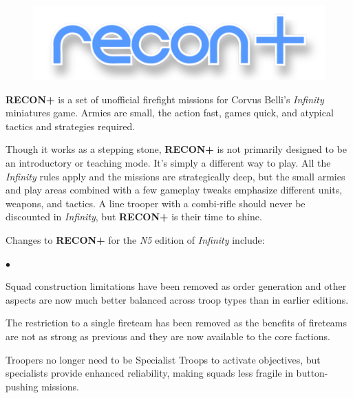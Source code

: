 \documentclass[14pt,dvipsnames]{extarticle}
\newenvironment{squishitemize}
{\begin{list}{$\bullet$}{%
    \setlength{\itemsep}{2pt}%
    \setlength{\parsep}{2pt}%
    \setlength{\topsep}{2pt}%
    \setlength{\parskip}{0pt} %
    \renewcommand{\labelitemi}{--}}}
  {\end{list}}
\newcommand{\reconplus}{\textbf{RECON+}\xspace}
\newcommand\BackgroundPic[1]{%
\put(0,0){%
\parbox[b][\paperheight]{\paperwidth}{%
\vfill%
\centering%
\texttt{[image: \#1]}%
\vfill%
}}}
\newcommand{\setbackground}{%
\AddToShipoutPicture{\BackgroundPic{art/background/background.pdf}}%
}
\begin{document}
\thispagestyle{empty}


\clearpage


\begin{figure}[t!]
  \centering
  \includegraphics{art/cover/title.pdf}
\end{figure}

\reconplus is a set of unofficial firefight missions for Corvus
Belli's \emph{Infinity} miniatures game.  Armies are small, the action
fast, games quick, and atypical tactics and strategies required.

Though it works as a stepping stone, \reconplus is not primarily
designed to be an introductory or teaching mode.  It's simply a
different way to play.  All the \emph{Infinity} rules apply and the
missions are strategically deep, but the small armies and play areas
combined with a few gameplay tweaks emphasize different units,
weapons, and tactics.  A line trooper with a combi-rifle should never
be discounted in \emph{Infinity}, but \reconplus is their time to
shine.


Changes to \reconplus for the \emph{N5} edition of \emph{Infinity}
include:
\begin{squishitemize}
\item Squad construction limitations have been removed as order
  generation and other aspects are now much better balanced across
  troop types than in earlier editions.

\item The restriction to a single fireteam has been removed as the
  benefits of fireteams are not as strong as previous and they are now
  available to the core factions.

\item Troopers no longer need to be Specialist Troops to activate
  objectives, but specialists provide enhanced reliability, making
  squads less fragile in button-pushing missions.


\end{squishitemize}
\end{document}
